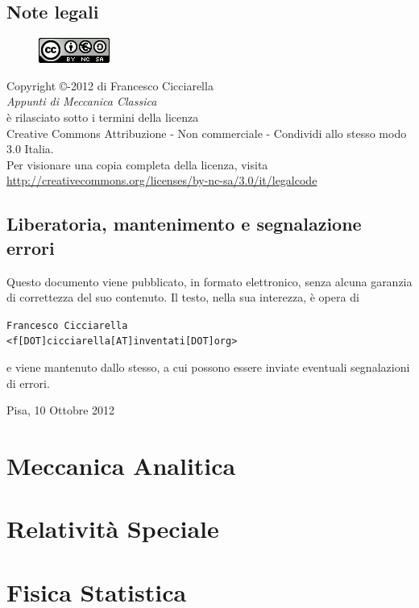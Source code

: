 \documentclass[12pt]{report}
\theoremstyle{plain}
\theoremstyle{definition}
\theoremstyle{remark}
\numberwithin{equation}{section}
\begin{document}
\section*{Note legali}
\begin{center}
\begin{figure}[htbp]
\centering
\includegraphics[scale=1]{Addons/88x31.png}
\end{figure}
\vspace{0.5cm}
Copyright \copyright {}-2012 di Francesco Cicciarella \\
\textit{Appunti di Meccanica Classica} \\	
è rilasciato sotto i termini della licenza \\
Creative Commons Attribuzione - Non commerciale - Condividi allo stesso modo 3.0 Italia. \\
Per visionare una copia completa della licenza, visita \\
\url{http://creativecommons.org/licenses/by-nc-sa/3.0/it/legalcode}
\end{center}
\section*{Liberatoria, mantenimento e segnalazione errori}
Questo documento viene pubblicato, in formato elettronico, senza alcuna garanzia di correttezza del suo contenuto. Il testo, nella sua interezza, è opera di \\

\vspace{0.3cm}
\begin{flushleft}
\texttt{Francesco Cicciarella}\\
\texttt{<f[DOT]cicciarella[AT]inventati[DOT]org>}
\end{flushleft}
\vspace{0.3cm}
e viene mantenuto dallo stesso, a cui possono essere inviate eventuali segnalazioni di errori.
\vspace{1cm}
\begin{flushright}
Pisa, 10 Ottobre 2012
\end{flushright}
\pagebreak

\tableofcontents
\pagebreak

\chapter{Meccanica Analitica}


\chapter{Relatività Speciale}

\chapter{Fisica Statistica}

\end{document}
